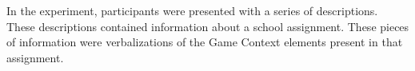 \documentclass[11pt]{article}
\begin{document}
In the experiment, participants were presented with a series of descriptions. These descriptions contained information about a school assignment. These pieces of information were verbalizations of the Game Context elements present in that assignment. 
\end{document}
